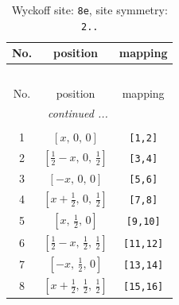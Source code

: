 \documentclass[fleqn,8pt]{jsarticle}
\begin{document}
\renewcommand{\arraystretch}{1.2}
\begin{longtable}{ccc}
\caption{Wyckoff site: {\tt 8e}, site symmetry: {\tt 2..}}
 \\
 \hline \hline
No. & position & mapping \\ \hline \endfirsthead

\multicolumn{2}{l}{\tablename\ \thetable{}} \\
 \hline \hline
No. & position & mapping \\ \hline \endhead

 \hline \hline
\multicolumn{2}{r}{\footnotesize\it continued ...} \\ \endfoot

 \hline \hline
\multicolumn{2}{r}{} \\ \endlastfoot

1 & $\left[ x,\, 0,\, 0 \right]$ & {\tt [1,2]} \\ \hline
2 & $\left[ \frac{1}{2} - x,\, 0,\, \frac{1}{2} \right]$ & {\tt [3,4]} \\ \hline
3 & $\left[ - x,\, 0,\, 0 \right]$ & {\tt [5,6]} \\ \hline
4 & $\left[ x + \frac{1}{2},\, 0,\, \frac{1}{2} \right]$ & {\tt [7,8]} \\ \hline
5 & $\left[ x,\, \frac{1}{2},\, 0 \right]$ & {\tt [9,10]} \\ \hline
6 & $\left[ \frac{1}{2} - x,\, \frac{1}{2},\, \frac{1}{2} \right]$ & {\tt [11,12]} \\ \hline
7 & $\left[ - x,\, \frac{1}{2},\, 0 \right]$ & {\tt [13,14]} \\ \hline
8 & $\left[ x + \frac{1}{2},\, \frac{1}{2},\, \frac{1}{2} \right]$ & {\tt [15,16]} \\
\end{longtable}
\renewcommand{\arraystretch}{1.2}
\end{document}
